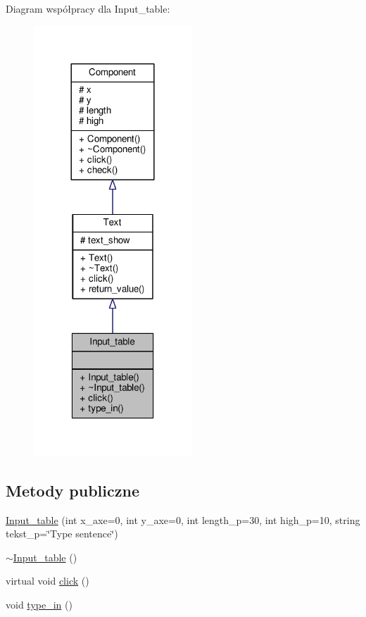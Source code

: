 Diagram współpracy dla Input\+\_\+table\+:\nopagebreak
\begin{figure}[H]
\begin{center}
\leavevmode
\includegraphics[width=168pt]{classInput__table__coll__graph}
\end{center}
\end{figure}
\subsection*{Metody publiczne}
\begin{DoxyCompactItemize}
\item 
\hyperlink{classInput__table_a45587a7a164f060d4bc10e30e2226e5d}{Input\+\_\+table} (int x\+\_\+axe=0, int y\+\_\+axe=0, int length\+\_\+p=30, int high\+\_\+p=10, string tekst\+\_\+p=\char`\"{}Type sentence\char`\"{})
\item 
\hyperlink{classInput__table_a22e1bdc68b3b830a03474b4897c6d47e}{$\sim$\+Input\+\_\+table} ()
\item 
virtual void \hyperlink{classInput__table_ac48806d103ed557c4b9a4eac4a021cf3}{click} ()
\item 
void \hyperlink{classInput__table_a6a4752b474d1a42c9f48bbb1e8af82a8}{type\+\_\+in} ()
\end{DoxyCompactItemize}

